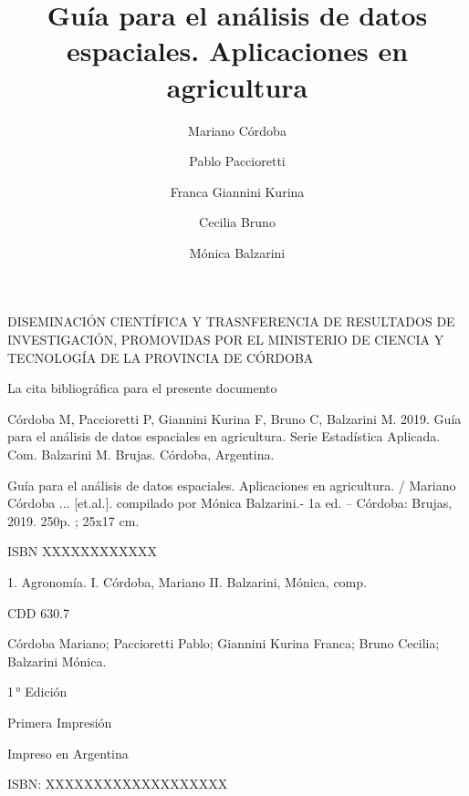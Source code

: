 \documentclass[11pt,b5paper,]{krantz}
\title{Guía para el análisis de datos espaciales. Aplicaciones en agricultura}
\author{Mariano Córdoba \and Pablo Paccioretti \and Franca Giannini Kurina \and Cecilia Bruno \and Mónica Balzarini}
\date{}
\begin{document}
\maketitle



\begin{center}
	{DISEMINACIÓN CIENTÍFICA Y TRASNFERENCIA DE RESULTADOS DE INVESTIGACIÓN, PROMOVIDAS POR EL MINISTERIO DE CIENCIA Y TECNOLOGÍA DE LA PROVINCIA DE CÓRDOBA}
\end{center}

\medskip

La cita bibliográfica para el presente documento

Córdoba M, Paccioretti P, Giannini Kurina F, Bruno C, Balzarini M. 2019. Guía para el análisis de datos espaciales en agricultura. Serie Estadística Aplicada. Com. Balzarini M. Brujas. Córdoba, Argentina.

\bigskip

\begin{framed}
\smallskip
   {\scriptsize Guía para el análisis de datos espaciales. Aplicaciones en agricultura. / Mariano Córdoba ... [et.al.]. compilado por Mónica Balzarini.- 1a ed. – Córdoba: Brujas, 2019.  250p. ; 25x17 cm.
    
   ISBN XXXXXXXXXXXX
            
 1. Agronomía. I. Córdoba, Mariano II. Balzarini, Mónica, comp. 


   CDD 630.7}
   
\smallskip

\end{framed}

\medskip
\textcopyright    Córdoba Mariano; Paccioretti Pablo; Giannini Kurina Franca; Bruno Cecilia; Balzarini Mónica.

{ 

1\,° Edición 

Primera Impresión

Impreso en Argentina

ISBN: XXXXXXXXXXXXXXXXXXX

}
\end{document}
